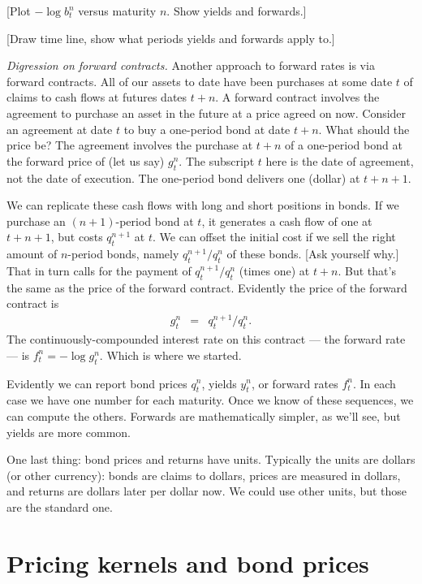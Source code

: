 \documentclass[11pt]{article}
\begin{document}
[Plot $-\log b^n_t$ versus maturity $n$.  Show yields and forwards.]

[Draw time line, show what periods yields and forwards apply to.]


{\it Digression on forward contracts.\/}
Another approach to forward rates is via forward contracts.
All of our assets to date have been purchases at some date $t$
of claims to cash flows at futures dates $t+n$.
A forward contract involves the agreement to purchase an asset in the future
at a price agreed on now.
Consider an agreement at date $t$  to buy a one-period bond at date $t+n$.
What should the price be?
The agreement involves the purchase at $t+n$ of a one-period bond at the forward price of (let us say) $g^n_t$.
The subscript $t$ here is the date of agreement, not the date of execution.
The one-period bond delivers one (dollar) at $t+n+1$.

We can replicate these cash flows with long and short positions in bonds.
If we purchase an $(n+1)$-period bond at $t$, it generates a cash flow of one at $t+n+1$,
but costs $q^{n+1}_t$ at $t$.
We can offset the initial cost if we sell the right amount of $n$-period bonds,
namely $ q^{n+1}_t/q^n_t$ of these bonds.  [Ask yourself why.]
That in turn calls for the payment of $ q^{n+1}_t/q^n_t$ (times one) at $t+n$.
But that's the same as the price of the forward contract.
Evidently the price of the forward contract is
\begin{eqnarray*}
    g^n_t &=&  q^{n+1}_t/q^n_t .
\end{eqnarray*}
The continuously-compounded interest rate on this contract --- the forward rate ---
is $ f^n_t = - \log g^n_t$.
Which is where we started.


Evidently we can report bond prices $q^n_t$,
yields $y^n_t$, or forward rates $f^n_t$.
In each case we have one number for each maturity.
Once we know of these sequences, we can compute the others.
Forwards are mathematically simpler, as we'll see, but yields are more common.

One last thing:  bond prices and returns have units.
Typically the units are dollars (or other currency):
bonds are claims to dollars, prices are measured in dollars,
and returns are dollars later per dollar now.
We could use other units, but those are the standard one.


\section{Pricing kernels and bond prices}
\end{document}

